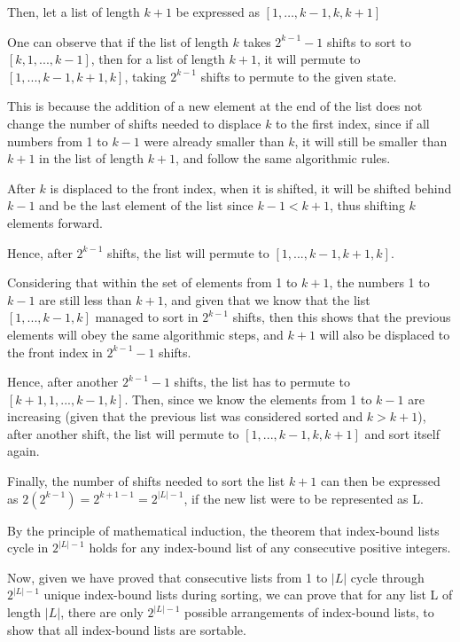 \documentclass[12pt]{article}
\begin{document}
Then, let a list of length $k+1$ be expressed as $[1, …, k-1, k, k+1]$

One can observe that if the list of length $k$ takes $2^{k-1}-1$ shifts to sort to $[k, 1, ..., k-1]$, then for a list of length $k+1$, it will permute to $[1, ..., k-1, k+1, k]$, taking $2^{k-1}$ shifts to permute to the given state.

This is because the addition of a new element at the end of the list does not change the number of shifts needed to displace $k$ to the first index, since if all numbers from 1 to $k-1$ were already smaller than $k$, it will still be smaller than $k+1$ in the list of length $k+1$, and follow the same algorithmic rules.

After $k$ is displaced to the front index, when it is shifted, it will be shifted behind $k-1$ and be the last element of the list since $k-1<k+1$, thus shifting $k$ elements forward.

Hence, after $2^{k-1}$ shifts, the list will permute to $[1, ..., k-1, k+1, k]$. 

Considering that within the set of elements from 1 to $k+1$, the numbers 1 to $k-1$ are still less than $k+1$, and given that we know that the list $[1, ..., k-1, k]$ managed to sort in $2^{k-1}$ shifts, then this shows that the previous elements will obey the same algorithmic steps, and $k+1$ will also be displaced to the front index in $2^{k-1}-1$ shifts.

Hence, after another $2^{k-1}-1$ shifts, the list has to permute to $[k+1, 1, ..., k-1, k]$. Then, since we know the elements from 1 to $k-1$ are increasing (given that the previous list was considered sorted and $k>k+1$), after another shift, the list will permute to $[1, ..., k-1, k, k+1]$ and sort itself again.

Finally, the number of shifts needed to sort the list $k+1$ can then be expressed as $2(2^{k-1}) = 2^{k+1-1} = 2^{|L|-1}$, if the new list were to be represented as L.

By the principle of mathematical induction, the theorem that index-bound lists cycle in $2^{|L|-1}$ holds for any index-bound list of any consecutive positive integers.

Now, given we have proved that consecutive lists from 1 to $|L|$ cycle through $2^{|L|-1}$ unique index-bound lists during sorting, we can prove that for any list L of length $|L|$, there are only $2^{|L|-1}$ possible arrangements of index-bound lists, to show that all index-bound lists are sortable.
\end{document}
